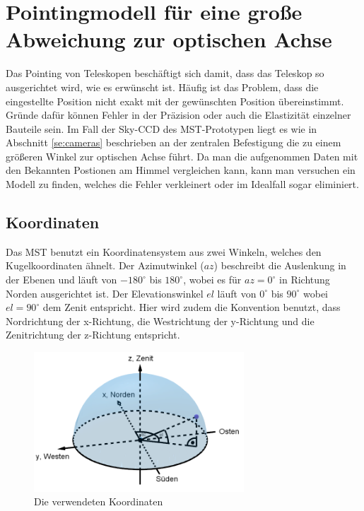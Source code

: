 \chapter{Pointingmodell für eine große Abweichung zur optischen Achse}
\label{ch:pointing}
Das Pointing von Teleskopen beschäftigt sich damit, dass das Teleskop so ausgerichtet wird, wie es erwünscht ist. Häufig ist das Problem, dass die eingestellte Position nicht exakt mit der gewünschten Position übereinstimmt. Gründe dafür können Fehler in der Präzision oder auch die Elastizität einzelner Bauteile sein. Im Fall der Sky-CCD des MST-Prototypen liegt es wie in Abschnitt \ref{se:cameras} beschrieben an der zentralen Befestigung die zu einem größeren Winkel zur optischen Achse führt. Da man die aufgenommen Daten mit den Bekannten Postionen am Himmel vergleichen kann, kann man versuchen ein Modell zu finden, welches die Fehler verkleinert oder im Idealfall sogar eliminiert.

\section{Koordinaten}
Das MST benutzt ein Koordinatensystem aus zwei Winkeln, welches den Kugelkoordinaten ähnelt. Der Azimutwinkel ($az$) beschreibt die Auslenkung in der Ebenen und läuft von $-180^{\circ}$ bis $180^{\circ}$, wobei es für $az=0^{\circ}$ in Richtung Norden ausgerichtet ist. Der Elevationswinkel $el$ läuft von $0^{\circ}$ bis $90^{\circ}$ wobei $el=90^{\circ}$ dem Zenit entspricht. Hier wird zudem die Konvention benutzt, dass Nordrichtung der x-Richtung, die Westrichtung der y-Richtung und die Zenitrichtung der z-Richtung entspricht.
\begin{figure}[htbp]
\centering
\includegraphics[width=0.7\textwidth]{Images/coordinates.png}
\caption{Die verwendeten Koordinaten}
\label{img:coordinates}
\end{figure}

